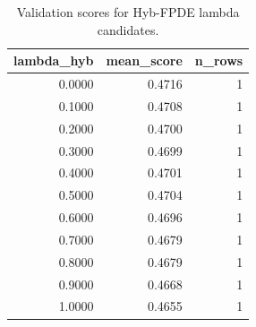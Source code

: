 \begin{table}[t]
\caption{Validation scores for Hyb-FPDE lambda candidates.}
\label{tab:lambda_distribution_computed}
\centering
\begin{tabular}{rrr}
\toprule
lambda\_hyb & mean\_score & n\_rows \\
\midrule
0.0000 & 0.4716 & 1 \\
0.1000 & 0.4708 & 1 \\
0.2000 & 0.4700 & 1 \\
0.3000 & 0.4699 & 1 \\
0.4000 & 0.4701 & 1 \\
0.5000 & 0.4704 & 1 \\
0.6000 & 0.4696 & 1 \\
0.7000 & 0.4679 & 1 \\
0.8000 & 0.4679 & 1 \\
0.9000 & 0.4668 & 1 \\
1.0000 & 0.4655 & 1 \\
\bottomrule
\end{tabular}

\end{table}
